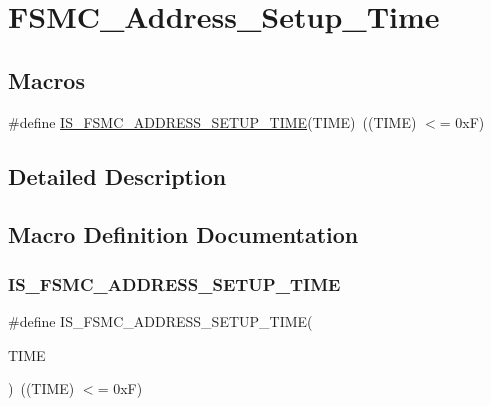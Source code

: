 \hypertarget{group___f_s_m_c___address___setup___time}{}\section{F\+S\+M\+C\+\_\+\+Address\+\_\+\+Setup\+\_\+\+Time}
\label{group___f_s_m_c___address___setup___time}
\subsection*{Macros}
\begin{DoxyCompactItemize}
\item 
\#define \mbox{\hyperlink{group___f_s_m_c___address___setup___time_ga8b77d090338011abc1be7f4a420e2d8f}{I\+S\+\_\+\+F\+S\+M\+C\+\_\+\+A\+D\+D\+R\+E\+S\+S\+\_\+\+S\+E\+T\+U\+P\+\_\+\+T\+I\+ME}}(T\+I\+ME)~((T\+I\+ME) $<$= 0x\+F)
\end{DoxyCompactItemize}


\subsection{Detailed Description}


\subsection{Macro Definition Documentation}
\mbox{\label{group___f_s_m_c___address___setup___time_ga8b77d090338011abc1be7f4a420e2d8f}} 
\subsubsection{\texorpdfstring{IS\_FSMC\_ADDRESS\_SETUP\_TIME}{IS\_FSMC\_ADDRESS\_SETUP\_TIME}}
{\footnotesize\ttfamily \#define I\+S\+\_\+\+F\+S\+M\+C\+\_\+\+A\+D\+D\+R\+E\+S\+S\+\_\+\+S\+E\+T\+U\+P\+\_\+\+T\+I\+ME(\begin{DoxyParamCaption}\item[{}]{T\+I\+ME }\end{DoxyParamCaption})~((T\+I\+ME) $<$= 0x\+F)}

